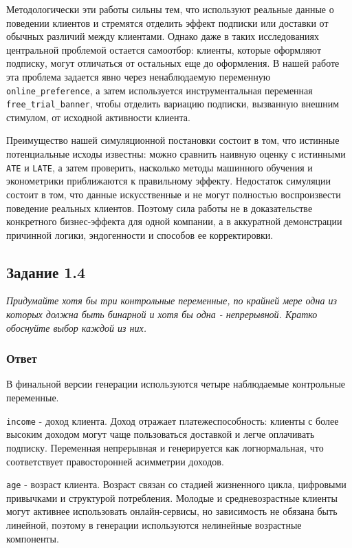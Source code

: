\documentclass[11pt]{article}
\newenvironment{tasktext}
      {\begin{tcolorbox}[breakable, colback=black!3, colframe=black!28,
        boxrule=0.4pt, arc=1.5mm, left=7pt, right=7pt, top=5pt, bottom=5pt,
        before skip=0.35em, after skip=0.75em]\itshape}
      {\end{tcolorbox}}
\begin{document}
Методологически эти работы сильны тем, что используют реальные данные о
поведении клиентов и стремятся отделить эффект подписки или доставки от
обычных различий между клиентами. Однако даже в таких исследованиях
центральной проблемой остается самоотбор: клиенты, которые оформляют
подписку, могут отличаться от остальных еще до оформления. В нашей
работе эта проблема задается явно через ненаблюдаемую переменную
\texttt{online\_preference}, а затем используется инструментальная
переменная \texttt{free\_trial\_banner}, чтобы отделить вариацию
подписки, вызванную внешним стимулом, от исходной активности клиента.

Преимущество нашей симуляционной постановки состоит в том, что истинные
потенциальные исходы известны: можно сравнить наивную оценку с истинными
\texttt{ATE} и \texttt{LATE}, а затем проверить, насколько методы
машинного обучения и эконометрики приближаются к правильному эффекту.
Недостаток симуляции состоит в том, что данные искусственные и не могут
полностью воспроизвести поведение реальных клиентов. Поэтому сила работы
не в доказательстве конкретного бизнес-эффекта для одной компании, а в
аккуратной демонстрации причинной логики, эндогенности и способов ее
корректировки.

\subsection{Задание 1.4}\label{ux437ux430ux434ux430ux43dux438ux435-1.4}

\begin{tasktext}
Придумайте хотя бы три контрольные переменные, по крайней мере одна из
которых должна быть бинарной и хотя бы одна - непрерывной. Кратко
обоснуйте выбор каждой из них.
\end{tasktext}

\subsubsection{Ответ}\label{ux43eux442ux432ux435ux442-3}

В финальной версии генерации используются четыре наблюдаемые контрольные
переменные.

\texttt{income} - доход клиента. Доход отражает платежеспособность:
клиенты с более высоким доходом могут чаще пользоваться доставкой и
легче оплачивать подписку. Переменная непрерывная и генерируется как
логнормальная, что соответствует правосторонней асимметрии доходов.

\texttt{age} - возраст клиента. Возраст связан со стадией жизненного
цикла, цифровыми привычками и структурой потребления. Молодые и
средневозрастные клиенты могут активнее использовать онлайн-сервисы, но
зависимость не обязана быть линейной, поэтому в генерации используются
нелинейные возрастные компоненты.
\end{document}
